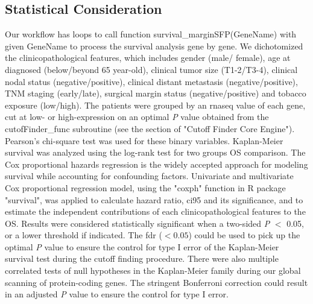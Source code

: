 \documentclass[jpm,article,submit,moreauthors,pdftex]{Definitions/mdpi}
\begin{document}
\begin{paracol}{2}
\subsection{Statistical Consideration}

Our workflow has loops to call function survival\_marginSFP(GeneName) with given GeneName to process the survival analysis gene by gene.
We dichotomized the clinicopathological features, which includes gender (male/ female), age at diagnosed (below/beyond 65 year-old), clinical tumor size (T1-2/T3-4), clinical nodal status (negative/positive), clinical distant metastasis (negative/positive), TNM staging (early/late), surgical margin status (negative/positive) and tobacco exposure (low/high). The patients were grouped by an \acrshort{rnaseq} value of each gene, cut at low- or high-expression on an optimal \textit{P} value obtained from the cutofFinder\_func subroutine (see the section of "Cutoff Finder Core Engine"). Pearson's chi-square test was used for these binary variables. Kaplan-Meier survival was analyzed using the log-rank test for two groups OS comparison.
The Cox proportional hazards regression is the widely accepted approach for modeling survival while accounting for confounding factors\cite{Magen2019}. Univariate and multivariate Cox proportional regression model\cite{Andersen1982}, using the "coxph" function in R package "survival", was applied to calculate hazard ratio, \acrfull{ci95} and its significance, and to estimate the independent contributions of each clinicopathological features to the OS.
Results were considered statistically significant when a two-sided \textit{P} $<$ 0.05, or a lower threshold if indicated.
The \acrfull{fdr} ($< 0.05$) could be used to pick up the optimal \textit{P} value to ensure the control for type I error of the Kaplan-Meier survival test during the cutoff finding procedure.
There were also multiple correlated tests of null hypotheses in the Kaplan-Meier family during our global scanning of protein-coding genes. The stringent Bonferroni correction could result in an adjusted \textit{P} value to ensure the control for type I error. 


\end{paracol}
\end{document}

